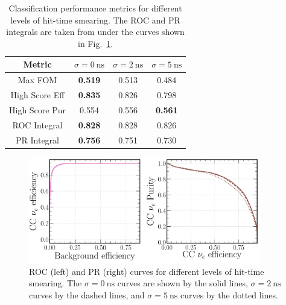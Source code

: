 \begin{table} %
    \begin{tabular}{cccc}
        Metric         & $\sigma=0~\mathrm{ns}$ & $\sigma=2~\mathrm{ns}$ & $\sigma=5~\mathrm{ns}$ \\
        \midrule
        Max FOM        & \textbf{0.519}         & 0.513                  & 0.484                  \\
        High Score Eff & \textbf{0.835}         & 0.826                  & 0.798                  \\
        High Score Pur & 0.554                  & 0.556                  & \textbf{0.561}         \\
        ROC Integral   & \textbf{0.828}         & 0.828                  & 0.826                  \\
        PR Integral    & \textbf{0.756}         & 0.751                  & 0.730                  \\
    \end{tabular}
    \caption[Classification performance metrics for different levels of hit-time smearing]
    {Classification performance metrics for different levels of hit-time smearing. The ROC and PR
        integrals are taken from under the curves shown in
        Fig.~\ref{fig:calib_time_nuel_comp_curves}.}
    \label{tab:calib_time}
\end{table}

\begin{figure} %
    \includegraphics[width=0.9\textwidth]{diagrams/7-results/calib_time_nuel_comp_curves.pdf}
    \caption[Receiver operating characteristic and precision-recall curves for different levels of hit-time smearing]
    {ROC (left) and PR (right) curves for different levels of hit-time smearing. The
        $\sigma=0~\mathrm{ns}$ curves are shown by the solid lines, $\sigma=2~\mathrm{ns}$ curves
        by the dashed lines, and $\sigma=5~\mathrm{ns}$ curves by the dotted lines.}
    \label{fig:calib_time_nuel_comp_curves}
\end{figure}

